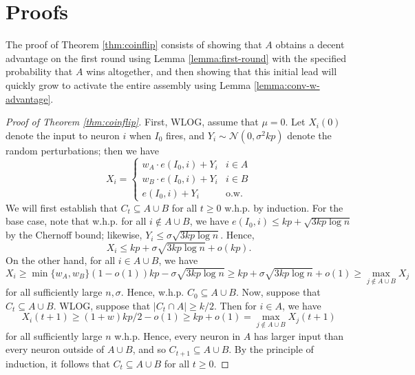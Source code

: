 \documentclass{article}
\theoremstyle{remark}
\newcommand{\1}{\mathbbm{1}}
\begin{document}
\section{Proofs}
The proof of Theorem \ref{thm:coinflip} consists of showing that $A$ obtains a decent advantage on the first round using Lemma \ref{lemma:first-round} with the specified probability that $A$ wins altogether, and then showing that this initial lead will quickly grow to activate the entire assembly using Lemma \ref{lemma:conv-w-advantage}.
\begin{proof}[Proof of Theorem \ref{thm:coinflip}]
    First, WLOG, assume that $\mu = 0$. Let $X_i(0)$ denote the input to neuron $i$ when $I_0$ fires, and $Y_i \sim \mathcal N(0, \sigma^2 kp)$ denote the random perturbations; then we have
    \[X_i = \begin{cases} w_A \cdot e(I_0, i) + Y_i & i \in A\\
    w_B \cdot e(I_0, i) + Y_i & i \in B\\
    e(I_0, i) + Y_i & \text{o.w.}
    \end{cases}\]
    We will first establish that $C_t \subseteq A \cup B$ for all $t \ge 0$ w.h.p. by induction. For the base case, note that w.h.p. for all $i \not\in A \cup B$, we have $e(I_0, i) \le kp + \sqrt{3kp \log n}$ by the Chernoff bound; likewise, $Y_i \le \sigma \sqrt{3kp\log n}$. Hence,
    \[X_i \le kp + \sigma \sqrt{3 kp \log n} + o(kp).\]
    On the other hand, for all $i \in A \cup B$, we have
    \[X_i \ge \min\{w_A, w_B\} (1-o(1)) kp - \sigma \sqrt{3 kp \log n} \ge kp + \sigma \sqrt{3 kp \log n} + o(1) \ge \max_{j \not\in A \cup B}X_j\]
    for all sufficiently large $n, \sigma$. Hence, w.h.p. $C_0 \subseteq A \cup B$. Now, suppose that $C_t \subseteq A \cup B$. WLOG, suppose that $|C_t \cap A| \ge k/2$. Then for $i \in A$, we have
    \[X_i(t+1) \ge (1 + w) kp / 2 - o(1) \ge kp + o(1) = \max_{j \not\in A \cup B} X_j(t+1)\]
    for all sufficiently large $n$ w.h.p. Hence, every neuron in $A$ has larger input than every neuron outside of $A \cup B$, and so $C_{t+1} \subseteq A \cup B$. By the principle of induction, it follows that $C_t \subseteq A \cup B$ for all $t \ge 0$.


\end{proof}
\end{document}
